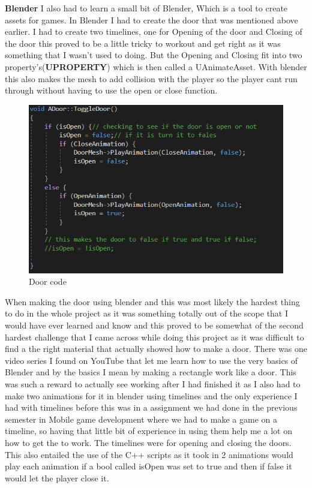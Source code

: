 \newline
\par\nobreak \textbf{Blender}
I also had to learn a small bit of Blender, Which is a tool to create assets for games. In Blender I had to create the door that was mentioned above earlier. I had to create two timelines, one for Opening of the door and Closing of the door this proved to be a little tricky to workout and get right as it was something that I wasn't used to doing. But the Opening and Closing fit into two property's(\textbf{UPROPERTY}) which is then called a UAnimateAsset. With blender this also makes the mesh to add collision with the player so the player cant run through without having to use the open or close function.
\begin{figure}[H]
    \centering
    \includegraphics[scale=.4]{img/Door.PNG}
    \caption{Door code}
    \label{Door}
\end{figure}
When making the door using blender and this was most likely the hardest thing to do in the whole project as it was something totally out of the scope that I would have ever learned and know and this proved to be somewhat of the second hardest challenge that I came across while doing this project as it was difficult to find a the right material that actually showed how to make a door. There was one video series I found on YouTube that let me learn how to use the very basics of Blender and by the basics I mean by making a rectangle work like a door. This was such a reward to actually see working after I had finished it as I also had to make two animations for it in blender using timelines and the only experience I had with timelines before this was in a assignment we had done in the previous semester in Mobile game development where we had to make a game on a timeline, so having that little bit of experience in using them help me a lot on how to get the to work. The timelines were for opening and closing the doors. This also entailed the use of the C++ scripts as it took in 2 animations would play each animation if a bool called isOpen was set to true and then if false it would let the player close it.
